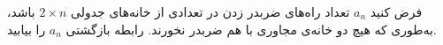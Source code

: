     \p 
فرض کنید
$a_n$
تعداد راه‌های ضربدر زدن در تعدادی از خانه‌های جدولی
$2 \times n$
باشد، به‌طوری که هیچ دو خانه‌ی مجاوری با هم ضربدر نخورند. رابطه بازگشتی
$a_n$
را بیابید.
